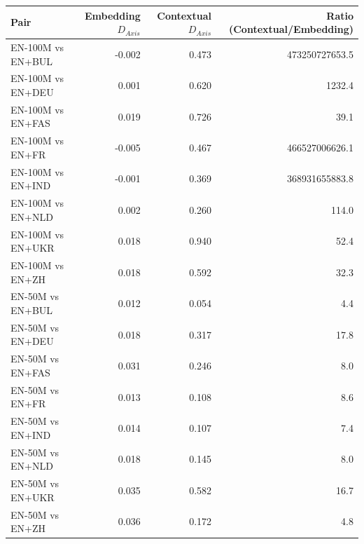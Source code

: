 \begin{tabular}{@{}lrrr@{}}
\toprule
Pair & Embedding $D_{Axis}$ & Contextual $D_{Axis}$ & Ratio (Contextual/Embedding) \\
\midrule
EN-100M vs EN+BUL & -0.002 & 0.473 & 473250727653.5 \\
EN-100M vs EN+DEU & 0.001 & 0.620 & 1232.4 \\
EN-100M vs EN+FAS & 0.019 & 0.726 & 39.1 \\
EN-100M vs EN+FR & -0.005 & 0.467 & 466527006626.1 \\
EN-100M vs EN+IND & -0.001 & 0.369 & 368931655883.8 \\
EN-100M vs EN+NLD & 0.002 & 0.260 & 114.0 \\
EN-100M vs EN+UKR & 0.018 & 0.940 & 52.4 \\
EN-100M vs EN+ZH & 0.018 & 0.592 & 32.3 \\
EN-50M vs EN+BUL & 0.012 & 0.054 & 4.4 \\
EN-50M vs EN+DEU & 0.018 & 0.317 & 17.8 \\
EN-50M vs EN+FAS & 0.031 & 0.246 & 8.0 \\
EN-50M vs EN+FR & 0.013 & 0.108 & 8.6 \\
EN-50M vs EN+IND & 0.014 & 0.107 & 7.4 \\
EN-50M vs EN+NLD & 0.018 & 0.145 & 8.0 \\
EN-50M vs EN+UKR & 0.035 & 0.582 & 16.7 \\
EN-50M vs EN+ZH & 0.036 & 0.172 & 4.8 \\
\bottomrule
\end{tabular}
